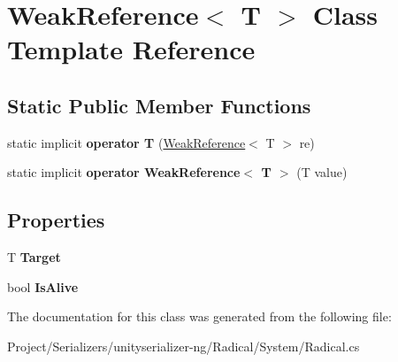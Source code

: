 \hypertarget{class_weak_reference}{}\section{Weak\+Reference$<$ T $>$ Class Template Reference}
\label{class_weak_reference}
\subsection*{Static Public Member Functions}
\begin{DoxyCompactItemize}
\item 
\mbox{\label{class_weak_reference_ac37493187825d4bc977bae1cb9539b29}} 
static implicit {\bfseries operator T} (\hyperlink{class_weak_reference}{Weak\+Reference}$<$ T $>$ re)
\item 
\mbox{\label{class_weak_reference_a22177097045b9c8b423927e211bfa7c3}} 
static implicit {\bfseries operator Weak\+Reference$<$ T $>$} (T value)
\end{DoxyCompactItemize}
\subsection*{Properties}
\begin{DoxyCompactItemize}
\item 
\mbox{\label{class_weak_reference_a2a0d5016c3ce0d81bc10fff68f7a0d7d}} 
T {\bfseries Target}
\item 
\mbox{\label{class_weak_reference_a8e3c6f9ec8a6c6920900949950515e63}} 
bool {\bfseries Is\+Alive}
\end{DoxyCompactItemize}


The documentation for this class was generated from the following file\+:\begin{DoxyCompactItemize}
\item 
Project/\+Serializers/unityserializer-\/ng/\+Radical/\+System/Radical.\+cs\end{DoxyCompactItemize}
